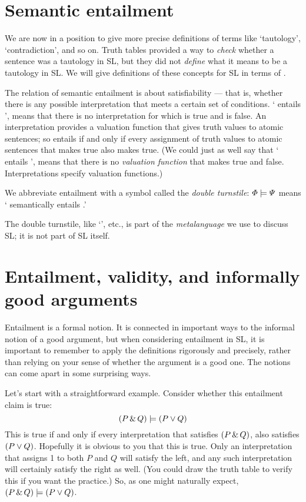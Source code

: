\section{Semantic entailment}

We are now in a position to give more precise definitions of terms like `tautology', `contradiction', and so on. Truth tables provided a way to \emph{check} whether a sentence was a tautology in SL, but they did not \emph{define} what it means to be a tautology in SL. We will give definitions of these concepts for SL in terms of .

The relation of semantic entailment is about satisfiability --- that is, whether there is any possible interpretation that meets a certain set of conditions. `\metaA{} entails \metaB{}', means that there is no interpretation for which \metaA{} is true and \metaB{} is false. An interpretation provides a valuation function that gives truth values to atomic sentences; so \metaA{} entails \metaB{} if and only if every assignment of truth values to atomic sentences that makes \metaA{} true also makes \metaB{} true. (We could just as well say that  `\metaA{} entails \metaB{}', means that there is no \emph{valuation function} that makes \metaA{} true and \metaB{} false. Interpretations specify valuation functions.)

We abbreviate entailment with a symbol called the \emph{double turnstile}:
$\varPhi{}\models\varPsi{}$ means `\metaA{} semantically entails \metaB{}.'

The double turnstile, like `\metaA{}', etc., is part of the \emph{metalanguage} we use to discuss SL; it is not part of SL itself.

\section{Entailment, validity, and informally good arguments}

Entailment is a formal notion. It is connected in important ways to the informal notion of a good argument, but when considering entailment in SL, it is important to remember to apply the definitions rigorously and precisely, rather than relying on your sense of whether the argument is a good one. The notions can come apart in some surprising ways.

Let's start with a straightforward example. Consider whether this entailment claim is true: $$(P\,\&\, Q) \models (P\vee Q)$$ This is true if and only if every interpretation that satisfies $(P\,\&\, Q)$, also satisfies  $(P\vee Q)$. Hopefully it is obvious to you that this is true. Only an interpretation that assigns 1 to both $P$ and $Q$ will satisfy the left, and any such interpretation will certainly satisfy the right as well. (You could draw the truth table to verify this if you want the practice.) So, as one might naturally expect, $(P\,\&\, Q) \models (P\vee Q)$.

